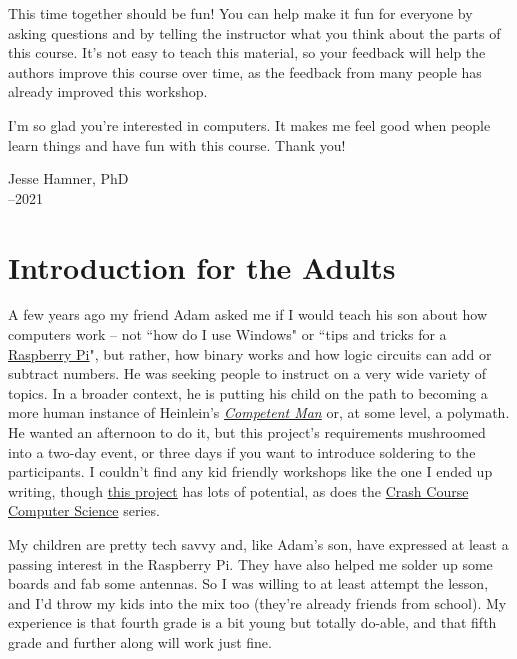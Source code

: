 This time together should be fun! You can help make it fun for everyone by asking questions and by telling the instructor what you think about the parts of this course. It's not easy to teach this material, so your feedback will help the authors improve this course over time, as the feedback from many people has already improved this workshop.

I'm so glad you're interested in computers. It makes me feel good when people learn things and have fun with this course. Thank you!
\bigskip

\noindent Jesse Hamner, PhD\\
--2021\\


\section{Introduction for the Adults}

A few years ago my friend Adam asked me if I would teach his son about how computers work -- not ``how do I use Windows" or ``tips and tricks for a {\color{webblue}\href{https://www.raspberrypi.org}{Raspberry Pi}}", but rather, how binary works and how logic circuits can add or subtract numbers. He was seeking people to instruct on a very wide variety of topics. In a broader context, he is putting his child on the path to becoming a more human instance of Heinlein's {\color{webblue}\href{https://en.wikipedia.org/wiki/Competent_man}{\emph{Competent Man}}} or, at some level, a polymath. He wanted an afternoon to do it, but this project's requirements mushroomed into a two-day event, or three days if you want to introduce soldering to the participants. I couldn't find any kid friendly workshops like the one I ended up writing, though {\color{webblue}\href{https://www.raspberrypi.org/blog/digital-making-curriculum/}{this project}} has lots of potential, as does the {\color{webblue}\href{https://www.youtube.com/playlist?list=PLME-KWdxI8dcaHSzzRsNuOLXtM2Ep_C7a}{Crash Course Computer Science}} series. 

My children are pretty tech savvy and, like Adam's son, have expressed at least a passing interest in the Raspberry Pi. They have also helped me solder up some boards and fab some antennas. So I was willing to at least attempt the lesson, and I'd throw my kids into the mix too (they're already friends from school). My experience is that fourth grade is a bit young but totally do-able, and that fifth grade and further along will work just fine.

